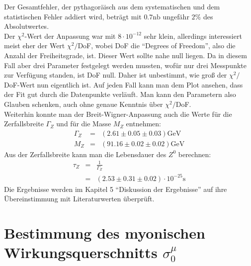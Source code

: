Der Gesamtfehler, der pythagoräisch aus dem systematischen und dem statistischen Fehler addiert wird, beträgt mit $0.7\si{\nano\barn}$ ungefähr $2\%$ des Absolutwertes.\\
Der $\chi^2$-Wert der Anpassung war mit $8\cdot10^{-12}$ sehr klein, allerdings interessiert meist eher der Wert $\chi^2/$DoF, wobei DoF die ``Degrees of Freedom'', also die Anzahl der Freiheitsgrade, ist. Dieser Wert sollte nahe null liegen. Da in diesem Fall aber drei Parameter festgelegt werden mussten, wofür nur drei Messpunkte zur Verfügung standen, ist DoF null. Daher ist unbestimmt, wie groß der $\chi^2/$DoF-Wert nun eigentlich ist. Auf jeden Fall kann man dem Plot  ansehen, dass der Fit gut durch die Datenpunkte verläuft. Man kann den Parametern also Glauben schenken, auch ohne genaue Kenntnis über $\chi^2/$DoF.\\
Weiterhin konnte man der Breit-Wigner-Anpassung auch die Werte für die Zerfallsbreite $\Gamma_Z$ und für die Masse $M_Z$ entnehmen:
\begin{eqnarray}
\Gamma_Z &=& (2.61 \pm 0.05 \pm 0.03)\si{\giga\electronvolt}\\
M_Z &=& (91.16 \pm 0.02 \pm 0.02)\si{\giga\electronvolt}
\end{eqnarray}
Aus der Zerfallsbreite kann man die Lebensdauer des $Z^0$ berechnen:
\begin{eqnarray}
\tau_Z &=& \frac{1}{\Gamma_Z}\\
&=& (2.53 \pm 0.31 \pm 0.02)\cdot 10^{-25}\si{\second}
\end{eqnarray}
Die Ergebnisse werden im Kapitel 5 ``Diskussion der Ergebnisse'' auf ihre Übereinstimmung mit Literaturwerten überprüft.

\section{Bestimmung des myonischen Wirkungsquerschnitts $\sigma_0^{\mu}$}
